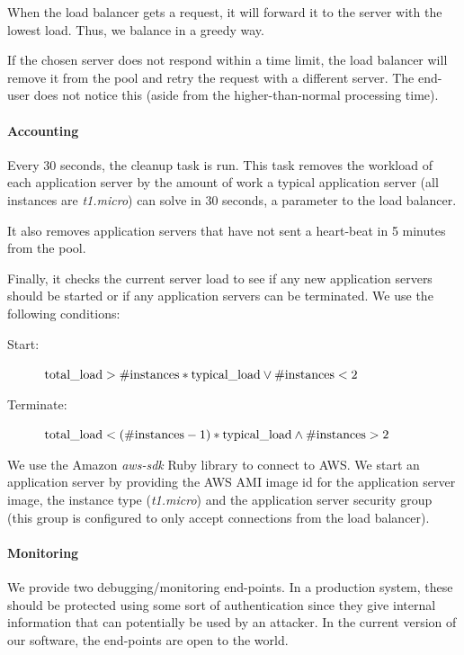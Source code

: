 			When the load balancer gets a request, it will forward it to the server with the lowest load.
			Thus, we balance in a greedy way.
			
			If the chosen server does not respond within a time limit, the load balancer will remove it from the pool and retry the request with a different server.
			The end-user does not notice this (aside from the higher-than-normal processing time).
		
		\paragraph{Accounting}
			\label{sys:arch:load:cleanup}
			Every 30 seconds, the cleanup task is run.
			This task removes the workload of each application server by the amount of work a typical application server (all instances are \textit{t1.micro}) can solve in 30 seconds, a parameter to the load balancer.
			
			It also removes application servers that have not sent a heart-beat in 5 minutes from the pool.
			
			Finally, it checks the current server load to see if any new application servers should be started or if any application servers can be terminated.
			We use the following conditions:
			
			\begin{description}
				\item[Start:] $\textnormal{total\_load} > \#\textnormal{instances} * \textnormal{typical\_load} \lor \#\textnormal{instances} < 2$
				\item[Terminate:] $\textnormal{total\_load} < (\#\textnormal{instances} - 1) * \textnormal{typical\_load} \land \#\textnormal{instances} > 2$
			\end{description}
			
			We use the Amazon \textit{aws-sdk} Ruby library to connect to AWS.
			We start an application server by providing the AWS AMI image id for the application server image,
			the instance type (\textit{t1.micro}) and the application server security group (this group is configured to only accept connections from the load balancer).
		
		\paragraph{Monitoring}
			We provide two debugging/monitoring end-points.
			In a production system, these should be protected using some sort of authentication since they give internal information that can potentially be used by an attacker.
			In the current version of our software, the end-points are open to the world.
			
